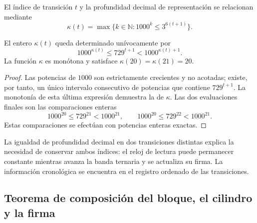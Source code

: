 \begin{definition}
El índice de transición \(t\) y la profundidad decimal de representación se
relacionan mediante
\begin{equation}
 \kappa(t)=\max\{k\in\mathbb N:1000^k\leq3^{6(t+1)}\}.
 \label{act21:eq:df-reloj}
\end{equation}
\end{definition}

\begin{proposition}
\label{act21:prop:df-reloj}
El entero \(\kappa(t)\) queda determinado unívocamente por
\begin{equation}
 1000^{\kappa(t)}\leq729^{t+1}<1000^{\kappa(t)+1}.
 \label{act21:eq:df-reloj-cotas}
\end{equation}
La función \(\kappa\) es monótona y satisface
\(\kappa(20)=\kappa(21)=20\).
\end{proposition}

\begin{proof}
Las potencias de \(1000\) son estrictamente crecientes y no acotadas;
existe, por tanto, un único intervalo consecutivo de potencias que
contiene \(729^{t+1}\). La monotonía de esta última expresión demuestra
la de \(\kappa\). Las dos evaluaciones finales son las comparaciones
enteras
\[
 1000^{20}\leq729^{21}<1000^{21},\qquad
 1000^{20}\leq729^{22}<1000^{21}.
\]
Estas comparaciones se efectúan con potencias enteras exactas.
\end{proof}

La igualdad de profundidad decimal en dos transiciones distintas explica
la necesidad de conservar ambos índices: el reloj de lectura puede
permanecer constante mientras avanza la banda ternaria y se actualiza su
firma. La información cronológica se encuentra en el registro ordenado
de las transiciones.

\subsection{Teorema de composición del bloque, el cilindro y la firma}

